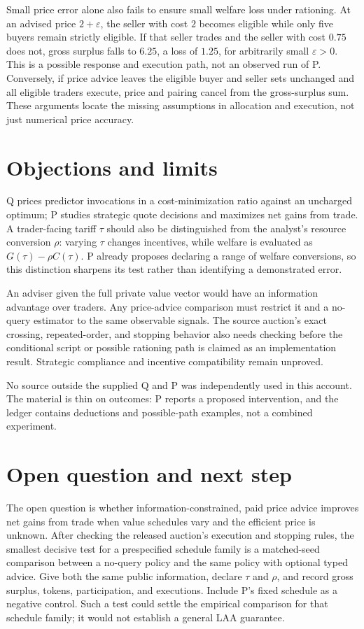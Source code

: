 \documentclass{article}
\begin{document}
Small price error alone also fails to ensure small welfare loss under rationing. At an advised price \(2+\varepsilon\), the seller with cost \(2\) becomes eligible while only five buyers remain strictly eligible. If that seller trades and the seller with cost \(0.75\) does not, gross surplus falls to \(6.25\), a loss of \(1.25\), for arbitrarily small \(\varepsilon>0\). This is a possible response and execution path, not an observed run of P. Conversely, if price advice leaves the eligible buyer and seller sets unchanged and all eligible traders execute, price and pairing cancel from the gross-surplus sum. These arguments locate the missing assumptions in allocation and execution, not just numerical price accuracy. 

\section{Objections and limits}

Q prices predictor invocations in a cost-minimization ratio against an uncharged optimum; P studies strategic quote decisions and maximizes net gains from trade. A trader-facing tariff \(\tau\) should also be distinguished from the analyst's resource conversion \(\rho\): varying \(\tau\) changes incentives, while welfare is evaluated as \(G(\tau)-\rho C(\tau)\). P already proposes declaring a range of welfare conversions, so this distinction sharpens its test rather than identifying a demonstrated error. 

An adviser given the full private value vector would have an information advantage over traders. Any price-advice comparison must restrict it and a no-query estimator to the same observable signals. The source auction's exact crossing, repeated-order, and stopping behavior also needs checking before the conditional script or possible rationing path is claimed as an implementation result. Strategic compliance and incentive compatibility remain unproved. 

No source outside the supplied Q and P was independently used in this account. The material is thin on outcomes: P reports a proposed intervention, and the ledger contains deductions and possible-path examples, not a combined experiment. 

\section{Open question and next step}

The open question is whether information-constrained, paid price advice improves net gains from trade when value schedules vary and the efficient price is unknown. After checking the released auction's execution and stopping rules, the smallest decisive test for a prespecified schedule family is a matched-seed comparison between a no-query policy and the same policy with optional typed advice. Give both the same public information, declare \(\tau\) and \(\rho\), and record gross surplus, tokens, participation, and executions. Include P's fixed schedule as a negative control. Such a test could settle the empirical comparison for that schedule family; it would not establish a general LAA guarantee. 
\end{document}
